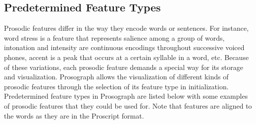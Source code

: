 \subsection{Predetermined Feature Types}
Prosodic features differ in the way they encode words or sentences. For instance, word stress is a feature that represents salience among a group of words, intonation and intensity are continuous encodings throughout successive voiced phones, accent is a peak that occurs at a certain syllable in a word, etc. Because of these variations, each prosodic feature demands a special way for its storage and visualization. Prosograph allows the visualization of different kinds of prosodic features through the selection of its feature type in initialization. Predetermined feature types in Prosograph are listed below with some examples of prosodic features that they could be used for. Note that features are aligned to the words as they are in the Proscript format. 


